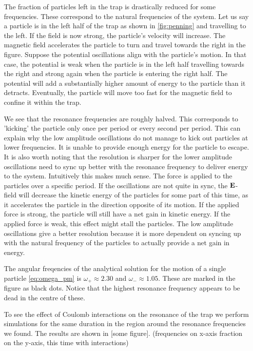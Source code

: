 The fraction of particles left in the trap is drastically reduced for some frequencies.
These correspond to the natural frequencies of the system.
Let us say a particle is in the left half of the trap as shown in \autoref{fig:penning} and travelling to the
left. If the field is now strong, the particle's velocity will increase. The magnetic field accelerates the
particle to turn and travel towards the right in the figure. Suppose the potential oscillations align with
the particle's motion. In that case, the potential is weak when the particle is in the left half travelling
towards the right and strong again when the particle is entering the right half. The potential will add
a substantially higher amount of energy to the particle than it detracts. Eventually, the particle will
move too fast for the magnetic field to confine it within the trap.

We see that the resonance frequencies are roughly halved. This corresponds to 'kicking' the particle only once per period or every second per period. This can explain why the low amplitude oscillations do not manage to kick out particles at lower frequencies. It is unable to provide enough energy for the particle to escape. It is also worth noting that the resolution is sharper for
the lower amplitude oscillations need to sync up better with the resonance frequency to deliver energy to the system.
Intuitively this makes much sense. The force is applied to the particles over a specific period. If the oscillations are not quite in
sync, the $\bold{E}$-field will decrease the kinetic energy of the particles for some part of this time, as it accelerates the particle in the
direction opposite of its motion. If the applied force is strong, the particle will still have a net gain in kinetic energy. If the applied force is
weak, this effect might stall the particles. The low amplitude oscillations give a better resolution because it is more dependent on syncing
 up with the natural frequency of the particles to actually provide a net gain in energy.

The angular freqencies of the analytical solution for the motion of a single particle \ref{eq:omega_pm} is $\omega_{+} \approx 2.30$ and $\omega_{-} \approx 1.05$. These are marked in the figure
as black dots. Notice that the highest resonance frequency appears to be dead in the centre of these.



To see the effect of Coulomb interactions on the resonance of the trap
we perform simulations for the same duration in the region around the resonance frequencies we
found.
The results are shown in [some figure].
(frequencies on x-axis fraction on the y-axis, this time with interactions)

